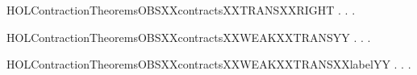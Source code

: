 \newcommand{\HOLContractionTheoremsOBSXXcontractsXXTRANSXXLEFT}{\UseVerbatim{HOLContractionTheoremsOBSXXcontractsXXTRANSXXLEFT}}
\begin{SaveVerbatim}{HOLContractionTheoremsOBSXXcontractsXXTRANSXXRIGHT}
\HOLTokenTurnstile{} \HOLSymConst{\HOLTokenForall{}} .
          \HOLSymConst{\HOLTokenImp{}}
       \HOLSymConst{\HOLTokenForall{}} .  \HOLTokenTransBegin{}\HOLTokenTransEnd {} \HOLSymConst{\HOLTokenImp{}} \HOLSymConst{\HOLTokenExists{}}.  \HOLTokenWeakTransBegin{}\HOLTokenWeakTransEnd {} \HOLSymConst{\HOLTokenConj{}}   
\end{SaveVerbatim}
\newcommand{\HOLContractionTheoremsOBSXXcontractsXXTRANSXXRIGHT}{\UseVerbatim{HOLContractionTheoremsOBSXXcontractsXXTRANSXXRIGHT}}
\begin{SaveVerbatim}{HOLContractionTheoremsOBSXXcontractsXXWEAKXXTRANSYY}
\HOLTokenTurnstile{} \HOLSymConst{\HOLTokenForall{}} .
          \HOLSymConst{\HOLTokenImp{}}
       \HOLSymConst{\HOLTokenForall{}} .  \HOLTokenWeakTransBegin{}\HOLTokenWeakTransEnd {} \HOLSymConst{\HOLTokenImp{}} \HOLSymConst{\HOLTokenExists{}}.  \HOLTokenWeakTransBegin{}\HOLTokenWeakTransEnd {} \HOLSymConst{\HOLTokenConj{}}   
\end{SaveVerbatim}
\newcommand{\HOLContractionTheoremsOBSXXcontractsXXWEAKXXTRANSYY}{\UseVerbatim{HOLContractionTheoremsOBSXXcontractsXXWEAKXXTRANSYY}}
\begin{SaveVerbatim}{HOLContractionTheoremsOBSXXcontractsXXWEAKXXTRANSXXlabelYY}
\HOLTokenTurnstile{} \HOLSymConst{\HOLTokenForall{}} .
          \HOLSymConst{\HOLTokenImp{}}
       \HOLSymConst{\HOLTokenForall{}} .
            \HOLTokenWeakTransBegin{} \HOLTokenWeakTransEnd {} \HOLSymConst{\HOLTokenImp{}}
           \HOLSymConst{\HOLTokenExists{}}.  \HOLTokenWeakTransBegin{} \HOLTokenWeakTransEnd {} \HOLSymConst{\HOLTokenConj{}}   
\end{SaveVerbatim}
